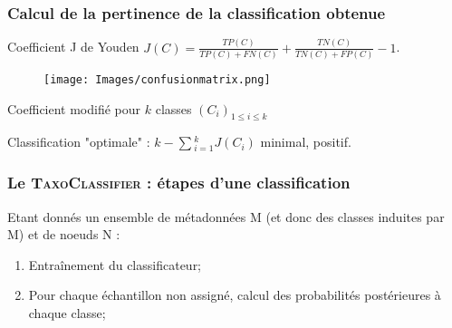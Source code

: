\documentclass{beamer}
\begin{document}
\begin{frame}
\frametitle{Calcul de la pertinence de la classification obtenue}


\begin{block}{Coefficient J de Youden}
$J(C) = \frac{TP(C)}{TP(C) + FN(C)} + \frac{TN(C)}{TN(C) + FP(C)} - 1$.
\end{block}

\begin{figure}
\centering
\texttt{[image: Images/confusionmatrix.png]}
\end{figure}




\begin{block}{Coefficient \alert{modifié} pour $k$ classes $(C_{i})_{1 \le i \le k}$}
\begin{center}
Classification "optimale" : $k - \sum{_{i = 1}^{k}}{J(C_{i})}$ minimal, positif.
\end{center}
\end{block}

\end{frame}

\begin{frame}
\frametitle{Le \textsc{\bf TaxoClassifier} : étapes d'une classification}

Etant donnés un ensemble de métadonnées M (et donc des classes induites par M) et de noeuds N :
\pause
\bigskip
\begin{enumerate}
\item \alert{Entraînement} du classificateur;
\pause
\item Pour chaque échantillon non assigné, calcul des \alert{probabilités postérieures} à chaque classe;
\end{enumerate}
\end{frame}
\end{document}
